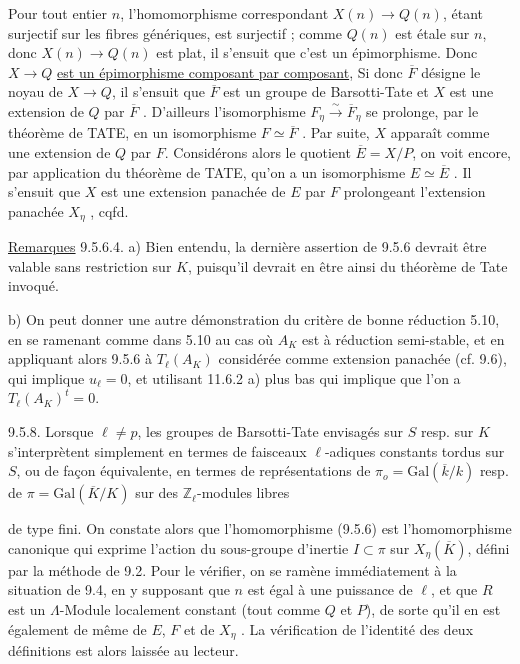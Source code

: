 
Pour tout entier $n$, l'homomorphisme correspondant $X(n) \longrightarrow Q(n)$, étant surjectif sur les fibres génériques, est surjectif ; comme $Q(n)$ est étale sur $n$, donc $X(n) \longrightarrow Q(n)$ est plat, il s'ensuit que c'est un épimorphisme. Donc $X \longrightarrow Q$ \underline{est un épimorphisme composant par composant}, Si donc $\overline{F}$ désigne le noyau de $X \longrightarrow Q$, il s'ensuit que $\overline{F}$ est un groupe de Barsotti-Tate et $X$ est une extension de $Q$ par $\overline{F}$ . D'ailleurs l'isomorphisme $F_\eta \xrightarrow{\sim} \overline{F}_\eta$ se prolonge, par le théorème de TATE, en un isomorphisme $F \simeq \overline{F}$ . Par suite, $X$ apparaît comme une extension de $Q$ par $F$. Considérons alors le quotient $\overline{E} = X/P$, on voit encore, par application du théorème de TATE, qu'on a un isomorphisme $E \simeq \overline{E}$ . Il s'ensuit que $X$ est une extension panachée de $E$ par $F$ prolongeant l'extension panachée $X_\eta$ , cqfd.

\underline{Remarques} 9.5.6.4.  a)  Bien entendu, la dernière assertion de 9.5.6 devrait être valable sans restriction sur $K$, puisqu'il devrait en être ainsi du théorème de Tate invoqué.

b)  On peut donner une autre démonstration du critère de bonne réduction 5.10, en se ramenant comme dans 5.10 au cas où $A_K$ est à réduction semi-stable, et en appliquant alors 9.5.6 à $T_\ell(A_K)$ considérée comme extension panachée (cf. 9.6), qui implique $u_\ell = 0$, et utilisant 11.6.2 a) plus bas qui implique que l'on a $T_\ell(A_K)^t = 0$.

9.5.8.  Lorsque $\ell \neq p$, les groupes de Barsotti-Tate envisagés sur $S$ resp. sur $K$ s'interprètent simplement en termes de faisceaux $\ell$-adiques constants tordus sur $S$, ou de façon équivalente, en termes de représentations de $\pi_o = \mathrm{Gal}(\overline{k}/k)$ resp. de $\pi = \mathrm{Gal}(\overline{K}/K)$ sur des $\mathbb{Z}_\ell$-modules libres



de type fini. On constate alors que l'homomorphisme (9.5.6) est l'homomorphisme canonique qui exprime l'action du sous-groupe d'inertie $I \subset \pi$ sur $X_\eta(\overline{K})$, défini par la méthode de 9.2. Pour le vérifier, on se ramène immédiatement à la situation de 9.4, en y supposant  que $n$ est égal à une puissance de $\ell$, et que $R$ est un $\Lambda$-Module localement constant (tout comme $Q$ et $P$), de sorte qu'il en est également de même de $E$, $F$ et de $X_\eta$ . La vérification de l'identité des deux définitions est alors laissée au lecteur.

